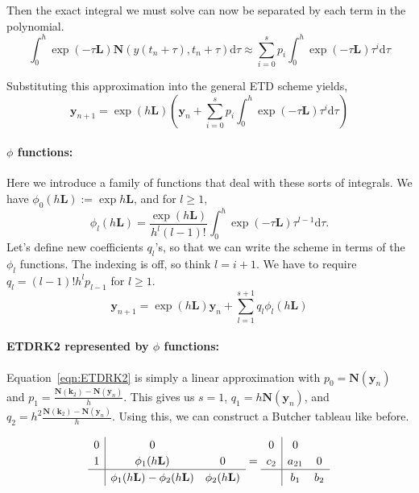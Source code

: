 \documentclass{article}
\newcommand{\bb}[1]{\mathbf{#1}}
\theoremstyle{definition}
\begin{document}
Then the exact integral we must solve can now be separated by each term in the polynomial. 
\begin{equation}
\int_{0}^h \exp(-\tau \bb{L}) \bb{N}(y(t_n+\tau), t_n+\tau) \mathrm{d}\tau \approx \sum_{i=0}^s p_i \int_0^h \exp(-\tau \bb{L}) \tau^i \mathrm{d}\tau
\end{equation}

Substituting this approximation into the general ETD scheme yields, 
\begin{equation}
\bb{y}_{n+1}= \exp(h\bb{L})\left(\bb{y}_n + \sum_{i=0}^s p_i\int_{0}^{h} \exp(-\tau \bb{L}) \tau^i \mathrm{d}\tau \right)
\label{eqn:ETDRKeq}
\end{equation}
\paragraph{$\phi$ functions:}
Here we introduce a family of functions that deal with these sorts of integrals. 
We have $\phi_0(h\bb{L}):= \exp{h\bb{L}}$, and for $l\geq 1$, 
\begin{equation}
\phi_l(h\bb{L}) = \frac{\exp(h\bb{L})}{h^l(l-1)!}\int_0^h \exp(-\tau \bb{L}) \tau^{l-1}\mathrm{d}\tau.
\end{equation}
Let's define new coefficients $q_l$'s, so that we can write the scheme in terms of the $\phi_l$ functions. 
The indexing is off, so think $l=i+1$.
We have to require $q_l = (l-1)!h^{l} p_{l-1}$ for $l\geq1$.
\begin{equation}
\bb{y}_{n+1}= \exp(h\bb{L}) \bb{y}_n + \sum_{l=1}^{s+1} q_l\phi_l(h\bb{L}) 
\label{eqn:ETDRKphi}
\end{equation}

\paragraph{ETDRK2 represented by $\phi$ functions:}
Equation~\ref{eqn:ETDRK2} is simply a linear approximation with $p_0= \bb{N}(\bb{y}_n)$ and $p_1 = \frac{\bb{N}(\bb{k}_2)-\bb{N}(\bb{y}_n)}{h}$.
This gives us $s=1$, $q_1 = h\bb{N}(\bb{y}_n)$, and $q_2 = h^2 \frac{\bb{N}(\bb{k}_2)-\bb{N}(\bb{y}_n)}{h}$.
Using this, we can construct a Butcher tableau like before. 

\[
\renewcommand\arraystretch{1.2}
\begin{array}
{c|ccc}
0& 0&\\
1& \phi_1(h\bb{L}) & 0\\
\hline
& \phi_1(h\bb{L})-\phi_2(h\bb{L}) &\phi_2(h\bb{L}) 
\end{array} = \begin{array}
{c|ccc}
0& 0&\\
c_2& a_{21} &0\\
\hline
& b_1 &b_2
\end{array}
\]
\end{document}
